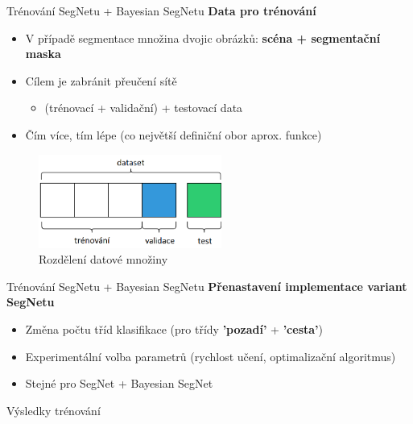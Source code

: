 \documentclass[aspectratio=1610]{beamer}
\begin{document}
\begin{frame}{Trénování SegNetu + Bayesian SegNetu}
\textbf{Data pro trénování}
\begin{itemize}
	\item V případě segmentace množina dvojic obrázků: \textbf{scéna + segmentační maska}
	\item Cílem je zabránit přeučení sítě
	\begin{itemize}
		\item (trénovací + validační) + testovací data
	\end{itemize}
	\item Čím více, tím lépe (co největší definiční obor aprox. funkce)
\end{itemize}
\begin{figure}[h]
	\begin{center}
		\includegraphics[width=6cm, keepaspectratio]{dataset.png}
	\end{center}
	\caption{Rozdělení datové množiny} 	
\end{figure}

\end{frame}
\begin{frame}{Trénování SegNetu + Bayesian SegNetu}
\textbf{Přenastavení implementace variant SegNetu}
	\begin{itemize}
		\item Změna počtu tříd klasifikace (pro třídy \textbf{'pozadí'} + \textbf{'cesta'})
		\item Experimentální volba parametrů (rychlost učení, optimalizační algoritmus)
		\item Stejné pro SegNet + Bayesian SegNet
	\end{itemize}
\end{frame}
\begin{frame}{Výsledky trénování}
\begin{center}
\end{center}
\end{frame}
\end{document}

